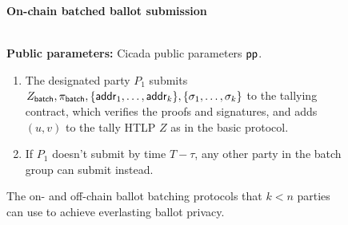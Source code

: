 \begin{figure}
\begin{mdframed}
    \end{mdframed}
    \begin{mdframed}
    \begin{center}
        \textbf{On-chain batched ballot submission}
    \end{center}
    \hfill\\
    \textbf{Public parameters:} Cicada public parameters $\mathsf{pp}$. \hfill\\
    \begin{enumerate}
        \item The designated party $P_1$ submits $Z_{\sf batch}, \pi_{\sf batch}, \{{\sf addr}_1, \dots, {\sf addr}_{k}\},\allowbreak \{\sigma_1, \dots, \sigma_{k}\}$ to the tallying contract, which verifies the proofs and signatures, and adds $(u,v)$ to the tally HTLP $Z$ as in the basic protocol.
        \item If $P_1$ doesn't submit by time $T-\tau$, any other party in the batch group can submit instead.
    \end{enumerate}
    \end{mdframed}
    
    \caption{The on- and off-chain ballot batching protocols that $k < n$ parties can use to achieve everlasting ballot privacy.}
    \label{fig:batching_ballots}
\end{figure}